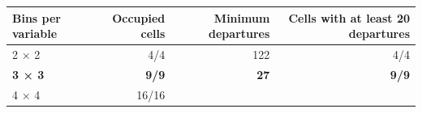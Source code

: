 \documentclass[11pt,]{article}
\begin{document}
\begin{longtable}[]{@{}lrrr@{}}
\toprule
\begin{minipage}[b]{0.26\columnwidth}\raggedright\strut
Bins per variable\strut
\end{minipage} & \begin{minipage}[b]{0.30\columnwidth}\raggedleft\strut
Occupied cells\strut
\end{minipage} & \begin{minipage}[b]{0.16\columnwidth}\raggedleft\strut
Minimum departures\strut
\end{minipage} & \begin{minipage}[b]{0.16\columnwidth}\raggedleft\strut
Cells with at least 20 departures\strut
\end{minipage}\tabularnewline
\midrule
\endhead
\begin{minipage}[t]{0.26\columnwidth}\raggedright\strut
2 × 2\strut
\end{minipage} & \begin{minipage}[t]{0.30\columnwidth}\raggedleft\strut
4/4\strut
\end{minipage} & \begin{minipage}[t]{0.16\columnwidth}\raggedleft\strut
122\strut
\end{minipage} & \begin{minipage}[t]{0.16\columnwidth}\raggedleft\strut
4/4\strut
\end{minipage}\tabularnewline
\begin{minipage}[t]{0.26\columnwidth}\raggedright\strut
\textbf{3 × 3}\strut
\end{minipage} & \begin{minipage}[t]{0.30\columnwidth}\raggedleft\strut
\textbf{9/9}\strut
\end{minipage} & \begin{minipage}[t]{0.16\columnwidth}\raggedleft\strut
\textbf{27}\strut
\end{minipage} & \begin{minipage}[t]{0.16\columnwidth}\raggedleft\strut
\textbf{9/9}\strut
\end{minipage}\tabularnewline
\begin{minipage}[t]{0.26\columnwidth}\raggedright\strut
4 × 4\strut
\end{minipage} & \begin{minipage}[t]{0.30\columnwidth}\raggedleft\strut
16/16\strut
\end{minipage} & \begin{minipage}[t]{0.16\columnwidth}\raggedleft\strut

\end{minipage}
\end{longtable}
\end{document}
